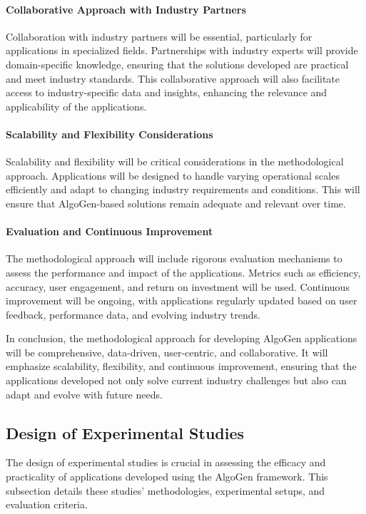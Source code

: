 \documentclass{article}
\begin{document}
\paragraph{Collaborative Approach with Industry Partners}
Collaboration with industry partners will be essential, particularly for applications in specialized fields. Partnerships with industry experts will provide domain-specific knowledge, ensuring that the solutions developed are practical and meet industry standards. This collaborative approach will also facilitate access to industry-specific data and insights, enhancing the relevance and applicability of the applications.

\paragraph{Scalability and Flexibility Considerations}
Scalability and flexibility will be critical considerations in the methodological approach. Applications will be designed to handle varying operational scales efficiently and adapt to changing industry requirements and conditions. This will ensure that AlgoGen-based solutions remain adequate and relevant over time.

\paragraph{Evaluation and Continuous Improvement}
The methodological approach will include rigorous evaluation mechanisms to assess the performance and impact of the applications. Metrics such as efficiency, accuracy, user engagement, and return on investment will be used. Continuous improvement will be ongoing, with applications regularly updated based on user feedback, performance data, and evolving industry trends.

In conclusion, the methodological approach for developing AlgoGen applications will be comprehensive, data-driven, user-centric, and collaborative. It will emphasize scalability, flexibility, and continuous improvement, ensuring that the applications developed not only solve current industry challenges but also can adapt and evolve with future needs.



\subsection{Design of Experimental Studies}

The design of experimental studies is crucial in assessing the efficacy and practicality of applications developed using the AlgoGen framework. This subsection details these studies' methodologies, experimental setups, and evaluation criteria.
\end{document}
